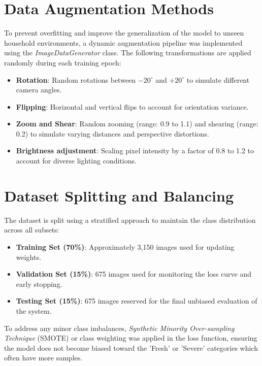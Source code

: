 \section[Data Augmentation Methods]{\textbf{Data Augmentation Methods}}
To prevent overfitting and improve the generalization of the model to unseen household environments, a dynamic augmentation pipeline was implemented using the \textit{ImageDataGenerator} class. The following transformations are applied randomly during each training epoch:
\begin{itemize}
    \item \textbf{Rotation}: Random rotations between $-20^{\circ}$ and $+20^{\circ}$ to simulate different camera angles.
    \item \textbf{Flipping}: Horizontal and vertical flips to account for orientation variance.
    \item \textbf{Zoom and Shear}: Random zooming (range: 0.9 to 1.1) and shearing (range: 0.2) to simulate varying distances and perspective distortions.
    \item \textbf{Brightness adjustment}: Scaling pixel intensity by a factor of 0.8 to 1.2 to account for diverse lighting conditions.
\end{itemize}

\section[Dataset Splitting and Balancing]{\textbf{Dataset Splitting and Balancing}}
The dataset is split using a stratified approach to maintain the class distribution across all subsets:
\begin{itemize}
    \item \textbf{Training Set (70\%)}: Approximately 3,150 images used for updating weights.
    \item \textbf{Validation Set (15\%)}: 675 images used for monitoring the loss curve and early stopping.
    \item \textbf{Testing Set (15\%)}: 675 images reserved for the final unbiased evaluation of the system.
\end{itemize}
To address any minor class imbalances, \textit{Synthetic Minority Over-sampling Technique} (SMOTE) or class weighting was applied in the loss function, ensuring the model does not become biased toward the 'Fresh' or 'Severe' categories which often have more samples.

